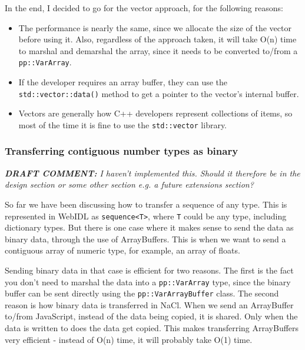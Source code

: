 In the end, I decided to go for the vector approach, for the following reasons:

\begin{itemize}
	\item The performance is nearly the same, since we allocate the size of the vector before using it. Also, regardless of the approach taken, it will take O(n) time to marshal and demarshal the array, since it needs to be converted to/from a \lstinline{pp::VarArray}.
	\item If the developer requires an array buffer, they can use the \lstinline{std::vector::data()} method to get a pointer to the vector's internal buffer.
	\item Vectors are generally how C++ developers represent collections of items, so most of the time it is fine to use the \lstinline{std::vector} library.
\end{itemize}

\subsubsection{Transferring contiguous number types as binary} %
\label{ssub:transferring_binary}
\emph{\textbf{DRAFT COMMENT:} I haven't implemented this. Should it therefore be in the design section or some other section e.g. a future extensions section?} 


So far we have been discussing how to transfer a sequence of any type. This is represented in WebIDL as \lstinline{sequence<T>}, where \lstinline{T} could be any type, including dictionary types. But there is one case where it makes sense to send the data as binary data, through the use of ArrayBuffers. This is when we want to send a contiguous array of numeric type, for example, an array of floats. 

Sending binary data in that case is efficient for two reasons. The first is the fact you don't need to marshal the data into a \lstinline{pp::VarArray} type, since the binary buffer can be sent directly using the \lstinline{pp::VarArrayBuffer} class. The second reason is how binary data is transferred in NaCl. When we send an ArrayBuffer to/from JavaScript, instead of the data being copied, it is shared. Only when the data is written to does the data get copied. This makes transferring ArrayBuffers very efficient - instead of O(n) time, it will probably take O(1) time.

